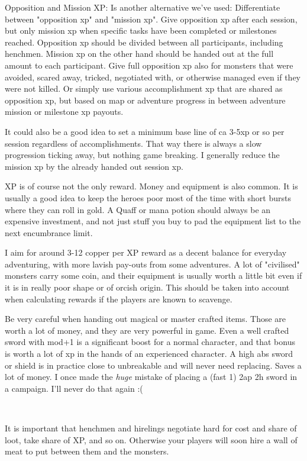 Opposition and Mission XP:
Is another alternative we've used: Differentiate between "opposition xp" and "mission xp". Give opposition xp after each session, but only mission xp when specific tasks have been completed or milestones reached.
Opposition xp should be divided between all participants, including henchmen. Mission xp on the other hand should be handed out at the full amount to each participant.
Give full opposition xp also for monsters that were avoided, scared away, tricked, negotiated with, or otherwise managed even if they were not killed. Or simply use various accomplishment xp that are shared as opposition xp, but based on map or adventure progress in between adventure mission or milestone xp payouts.

It could also be a good idea to set a minimum base line of ca 3-5xp or so per session regardless of accomplishments. That way there is always a slow progression ticking away, but nothing game breaking. I generally reduce the mission xp by the already handed out session xp.

XP is of course not the only reward. Money and equipment is also common. It is usually a good idea to keep the heroes poor most of the time with short bursts where they can roll in gold. A Quaff or mana potion should always be an expensive investment, and not just stuff you buy to pad the equipment list to the next encumbrance limit.

I aim for around 3-12 copper per XP reward as a decent balance for everyday adventuring, with more lavish pay-outs from some adventures. A lot of "civilised" monsters carry some coin, and their equipment is usually worth a little bit even if it is in really poor shape or of orcish origin. This should be taken into account when calculating rewards if the players are known to scavenge.

Be very careful when handing out magical or master crafted items. Those are worth a lot of money, and they are very powerful in game. Even a well crafted sword with mod+1 is a significant boost for a normal character, and that bonus is worth a lot of xp in the hands of an experienced character. A high abs sword or shield is in practice close to unbreakable and will never need replacing. Saves a lot of money.
I once made the \emph{huge} mistake of placing a (fast 1) 2ap 2h sword in a campaign. I'll never do that again :(

\

It is important that henchmen and hirelings negotiate hard for cost and share of loot, take share of XP, and so on. Otherwise your players will soon hire a wall of meat to put between them and the monsters.


